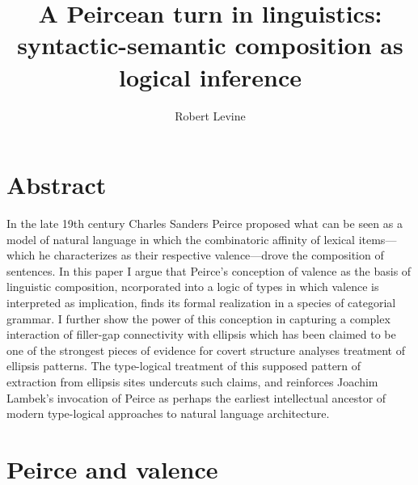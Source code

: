 \documentclass[output=paper,colorlinks,citecolor=brown]{langscibook}
\title{A Peircean turn in linguistics: syntactic-semantic composition as logical inference}
\author{Robert Levine\affiliation{Ohio State University}}
\begin{document}
\maketitle
\providecommand{\SetInfLen}{\relax}
\section{Abstract}
In the late 19th century Charles Sanders Peirce proposed what can be seen as a model of natural language in which the combinatoric affinity of lexical items—which he characterizes as their respective valence—drove the composition of sentences. In this paper I argue that Peirce’s conception of valence as the basis of linguistic composition,  ncorporated into a logic of types in which valence is interpreted as implication, finds its formal realization in a species of categorial grammar. I further show the power of this conception in capturing a complex interaction of filler-gap connectivity with ellipsis which has been claimed to be one of the strongest pieces of evidence for covert structure analyses treatment of ellipsis patterns. The type-logical treatment of this supposed pattern of extraction from ellipsis sites undercuts such claims, and reinforces Joachim Lambek’s invocation of Peirce as perhaps the earliest intellectual ancestor of modern type-logical approaches to natural language architecture.

\section{Peirce and valence}
\end{document}
